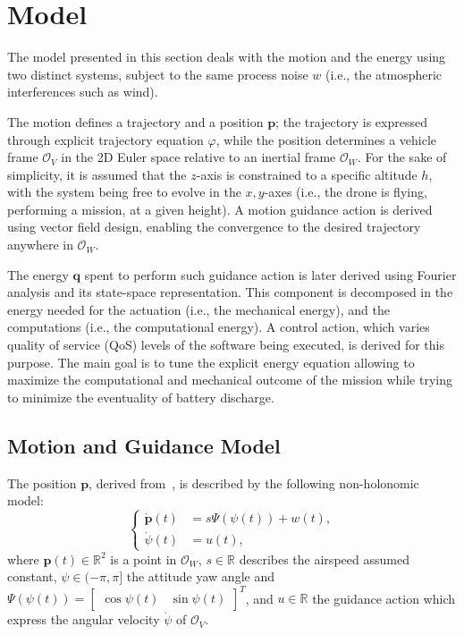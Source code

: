 \documentclass[letterpaper,10pt,conference]{ieeeconf}
\begin{document}
\section{Model}
\label{sec:estimation}

The model presented in this section deals with the motion and the energy using two distinct systems, subject to the same process noise $w$ (i.e., the atmospheric interferences such as wind). 

The motion defines a trajectory and a position $\mathbf{p}$; the trajectory is expressed through explicit trajectory equation $\varphi$, while the position determines a vehicle frame $\mathcal{O}_V$ in the 2D Euler space relative to an inertial frame $\mathcal{O}_W$. For the sake of simplicity, it is assumed that the $z$-axis is constrained to a specific altitude $h$, with the system being free to evolve in the $x,y$-axes (i.e., the drone is flying, performing a mission, at a given height). A motion guidance action is derived using vector field design, enabling the convergence to the desired trajectory anywhere in $\mathcal{O}_W$. 

The energy $\mathbf{q}$ spent to perform such guidance action is later derived using Fourier analysis and its state-space representation. This component is decomposed in the energy needed for the actuation (i.e., the mechanical energy), and the computations (i.e., the computational energy). A control action, which varies quality of service (QoS) levels of the software being executed, is derived for this purpose. The main goal is to tune the explicit energy equation allowing to maximize the computational and mechanical outcome of the mission while trying to minimize the eventuality of battery discharge.

\subsection{Motion and Guidance Model}
The position $\mathbf{p}$, derived from~\cite{de2017guidance}, is described by the following non-holonomic model:
\begin{equation}\label{eqq:1}\begin{cases}
  \dot{\mathbf{p}}(t)&=s\Psi(\psi(t))+w(t),\\
  \dot{\psi}(t)&=u(t),
\end{cases}
\end{equation}
where $\mathbf{p}(t)\in\mathbb{R}^2$ is a point in $\mathcal{O}_W$, $s\in\mathbb{R}$ describes the airspeed assumed constant, $\psi\in(-\pi,\pi]$ the attitude yaw angle and $\Psi(\psi(t))=\begin{bmatrix}\cos{\psi(t)} & \sin{\psi(t)}\end{bmatrix}^T$, and $u\in\mathbb{R}$ the guidance action which express the angular velocity $\dot{\psi}$ of $\mathcal{O}_V$.
\end{document}
